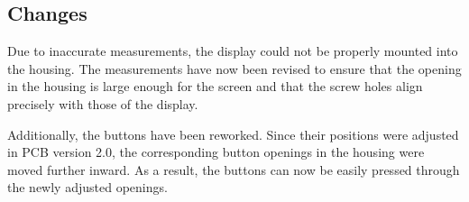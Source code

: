 \subsection*{Changes}

Due to inaccurate measurements, the display could not be properly mounted into the housing. The measurements have now been revised to ensure that the opening in the housing is large enough for the screen and that the screw holes align precisely with those of the display.

Additionally, the buttons have been reworked. Since their positions were adjusted in PCB version 2.0, the corresponding button openings in the housing were moved further inward. As a result, the buttons can now be easily pressed through the newly adjusted openings.